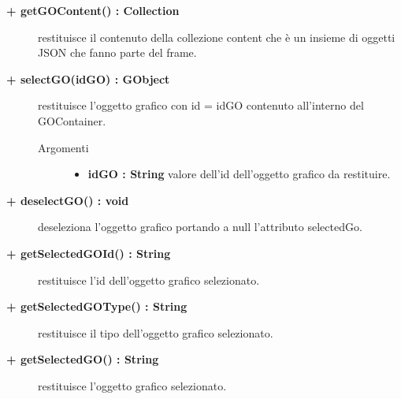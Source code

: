 \begin{description}
\begin{description}
\begin{description}
\end{description}

\end{description}

\begin{description}
		\item[\textbf{\color{blue}+ getGOContent() : Collection			}] \hfill
			restituisce il contenuto della collezione content che è un insieme di oggetti JSON che fanno parte del frame.
\end{description}

\begin{description}
		\item[\textbf{\color{blue}+ selectGO(idGO) : GObject			}] \hfill
			restituisce l'oggetto grafico con id = idGO contenuto all'interno del GOContainer. 

\begin{description}
			\item[Argomenti] \hfill
				\begin{itemize}
						\item \textbf{idGO : String			} \hfill
					valore dell'id dell'oggetto grafico da restituire.  				
				\end{itemize}

\end{description}

\end{description}

\begin{description}
		\item[\textbf{\color{blue}+ deselectGO() : void			}] \hfill
			deseleziona l'oggetto grafico portando a null l'attributo selectedGo. 
\end{description}

\begin{description}
		\item[\textbf{\color{blue}+ getSelectedGOId() : String			}] \hfill
			restituisce l'id dell'oggetto grafico selezionato.
\end{description}

\begin{description}
		\item[\textbf{\color{blue}+ getSelectedGOType() : String			}] \hfill
			restituisce il tipo dell'oggetto grafico selezionato.
\end{description}

\begin{description}
		\item[\textbf{\color{blue}+ getSelectedGO() : String			}] \hfill
			restituisce l'oggetto grafico selezionato.
\end{description}


\end{description}
